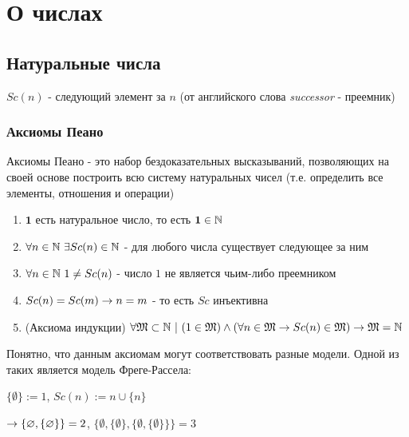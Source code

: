 \section{О числах}

\subsection{Натуральные числа}

\begin{definition}
    $Sc(n)$ - следующий элемент за $n$ (от английского слова \textit{successor} - преемник)
\end{definition}

\subsubsection{Аксиомы Пеано}

\begin{definition}
    Аксиомы Пеано - это набор бездоказательных высказываний, позволяющих на своей основе построить всю систему натуральных чисел (т.е. определить все элементы, отношения и операции)
\end{definition}

\begin{enumerate}
    \item $\mathbf{1}$ есть натуральное число, то есть $\mathbf{1} \in \mathbb{N}$
    \item $\forall n \in \mathbb{N}\ \exists Sc(n) \in \mathbb{N}$ - для любого числа существует следующее за ним
    \item $\forall n \in \mathbb{N}\ 1 \neq Sc(n)$ - число $1$ не является чьим-либо преемником
    \item $Sc(n) = Sc(m) \rightarrow n = m$ - то есть $Sc$ инъективна
    \item (Аксиома индукции) $\forall \mathfrak{M} \subset \mathbb{N}\ |\ (1 \in \mathfrak{M}) \wedge (\forall n \in \mathfrak{M} \rightarrow Sc(n) \in \mathfrak{M}) \rightarrow \mathfrak{M} = \mathbb{N}$
\end{enumerate}

\begin{example}
    Понятно, что данным аксиомам могут соответствовать разные модели. Одной из таких является модель Фреге-Рассела:
    
    $\{\emptyset\} := 1$, $Sc(n) := n \cup \{n\}$
    
    $\rightarrow \{\varnothing, \{\varnothing\}\} = 2$, $\{\emptyset, \{\emptyset\}, \{\emptyset, \{\emptyset\}\}\} = 3$
\end{example}

